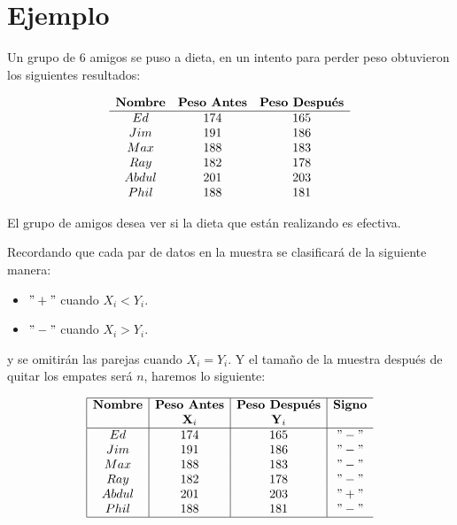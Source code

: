 \documentclass[
  a4paper,
  oneside,
  openany]{book}
\providecommand{\tightlist}{%
  \setlength{\itemsep}{0pt}\setlength{\parskip}{0pt}}
\begin{document}
\hypertarget{ejemplo-2}{%
\section{Ejemplo}\label{ejemplo-2}}

Un grupo de 6 amigos se puso a dieta, en un intento para perder peso obtuvieron los siguientes resultados:

\[
\begin{array}{c c c c } 
\textbf{Nombre} & \textbf{Peso Antes} & \textbf{Peso Después} \\
\hline
Ed    & 174 & 165 \\
Jim   & 191 & 186 \\
Max   & 188 & 183 \\
Ray   & 182 & 178 \\
Abdul & 201 & 203 \\
Phil  & 188 & 181 \\
\end{array} 
\]

El grupo de amigos desea ver si la dieta que están realizando es efectiva.

Recordando que cada par de datos en la muestra se clasificará de la siguiente manera:

\begin{itemize}
\tightlist
\item
  \("+"\) cuando \(X_{i} < Y_{i}.\)
\item
  \("-"\) cuando \(X_{i} > Y_{i}.\)
\end{itemize}

y se omitirán las parejas cuando \(X_i = Y_i\). Y el tamaño de la muestra después de quitar los empates será \(n\), haremos lo siguiente:

\[
\begin{array}{|c |c |c |c c c|}
\hline
\textbf{Nombre} & \textbf{Peso Antes} & \textbf{Peso Después} & \textbf{Signo} \\
 & \textbf{X}_i & \textbf{Y}_i & \\
 \hline
Ed    & 174 & 165  &  "-"   \\
Jim   & 191 & 186  &  "-" \\
Max   & 188 & 183  &  "-" \\
Ray   & 182 & 178  &  "-" \\
Abdul & 201 & 203  &  "+" \\
Phil  & 188 & 181  &  "-"  \\
\hline
\end{array} 
\]
\end{document}
